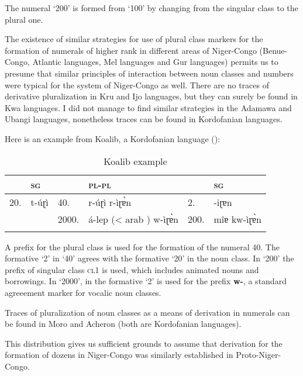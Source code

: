 The numeral `200' is formed from `100' by changing from the singular class to the plural one. 

The existence of similar strategies for use of plural class markers for the formation of numerals of higher rank in different areas of Niger-Congo (Benue-Congo, Atlantic languages, Mel languages and Gur languages) permits us to presume that similar principles of interaction between noun classes and numbers were typical for the system of Niger-Congo as well. There are no traces of derivative pluralization in Kru and Ijo languages, but they can surely be found in Kwa languages. I did not manage to find similar strategies in the Adamawa and Ubangi languages, nonetheless traces can be found in Kordofanian languages. 

Here is an example from Koalib, a Kordofanian language (): 

\begin{table}
\caption{Koalib example}
\label{tab:1:19}

\begin{tabularx}{\textwidth}{lllXlX}
\lsptoprule

&\textsc{sg} && \textsc{pl}-\textsc{pl} && \textsc{sg}\\
\midrule
20. &  t-{\'{u}}ɽì & 40.   &  r-{\'{u}}ɽì r-ìɽ{\`{ɐ}}n            & 2. &  -iɽɐn\\
    &              & 2000. &  {\'{a}}-lep (< arab  ) w-ìɽ{\`{ɐ}}n & 200. &  mîɐ kw-ìɽ{\`{ɐ}}n\\
\lspbottomrule
\end{tabularx}
\end{table}
 


A prefix for the plural class is used for the formation of the numeral 40. The formative ‘2’ in ‘40’ agrees with the formative ‘20’ in the noun class. In ‘200’ the prefix of singular class \textsc{cl}1 is used, which includes animated nouns and borrowings. In ‘2000’, in the formative ‘2’ is used for the prefix \textbf{w-}, a standard agreeement marker for vocalic noun classes. 

Traces of pluralization of noun classes as a means of derivation in numerals can be found in Moro and Acheron (both are Kordofanian languages). 

\largerpage
This distribution gives us sufficient grounds to assume that derivation for the formation of dozens in Niger-Congo was similarly established in Proto-Niger-Congo. 



